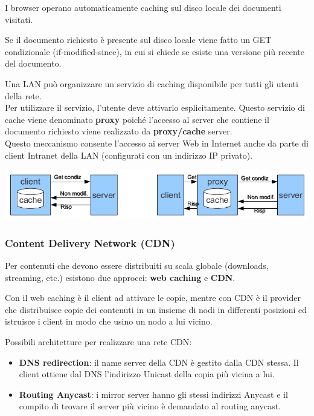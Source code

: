             I browser operano automaticamente caching sul disco locale dei documenti visitati.

            Se il documento richiesto è presente sul disco locale viene fatto un GET condizionale (if-modified-since), in cui si chiede se esiste una versione più recente del documento.

            Una LAN può organizzare un servizio di caching disponibile per tutti gli utenti della rete.\\
            Per utilizzare il servizio, l'utente deve attivarlo esplicitamente. Questo servizio di cache viene denominato \textbf{proxy} poiché l'accesso al server che contiene il documento richiesto viene realizzato da \textbf{proxy/cache} server.\\
            Questo meccanismo consente l'accesso ai server Web in Internet anche da parte di client Intranet della LAN (configurati con un indirizzo IP privato).
        
            \begin{center}
                \includegraphics[scale=0.4]{chapters/6/assets/schema_j.png}
            \end{center}

        \subsubsection{Content Delivery Network (CDN)}
            Per contenuti che devono essere distribuiti su scala globale (downloads, streaming, etc.) esistono due approcci: \textbf{web caching} e \textbf{CDN}.

            Con il web caching è il client ad attivare le copie, mentre con CDN è il provider che distribuisce copie dei contenuti in un insieme di nodi in differenti posizioni ed istruisce i client in modo che usino un nodo a lui vicino.

            Possibili architetture per realizzare una rete CDN:
            \begin{itemize}
                \item \textbf{DNS redirection}: il name server della CDN è gestito dalla CDN stessa. Il client ottiene dal DNS l'indirizzo Unicast della copia più vicina a lui.
                \item \textbf{Routing Anycast}: i mirror server hanno gli stessi indirizzi Anycast e il compito di trovare il server più vicino è demandato al routing anycast.
            \end{itemize}

